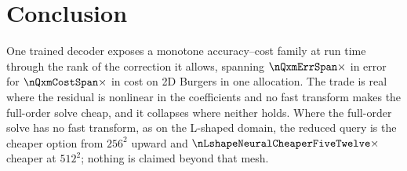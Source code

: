 \section{Conclusion}
\label{sec:conclusion}

One trained decoder exposes a monotone accuracy--cost family at run time through
the rank of the correction it allows, spanning $\nQxmErrSpan\times$ in error for
$\nQxmCostSpan\times$ in cost on 2D Burgers in one allocation. The trade is real
where the residual is nonlinear in the coefficients and no fast transform makes
the full-order solve cheap, and it collapses where neither holds. Where the
full-order solve has no fast transform, as on the L-shaped domain, the reduced
query is the cheaper option from $256^2$ upward and
$\nLshapeNeuralCheaperFiveTwelve\times$ cheaper at $512^2$; nothing is claimed
beyond that mesh.
